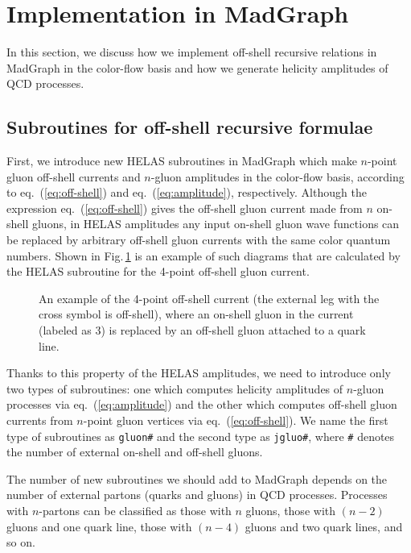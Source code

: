 \section{{\large Implementation in MadGraph}}
\label{implement}

In this section, we discuss how we implement off-shell recursive
relations in MadGraph in the color-flow
basis and how we generate helicity amplitudes of QCD processes.

\subsection{Subroutines for off-shell recursive formulae}
\label{subroutine}
First, we introduce new HELAS\cite{HELAS} subroutines in MadGraph which make
  $n$-point gluon off-shell currents and $n$-gluon amplitudes in the color-flow basis, according to
 eq.~(\ref{eq:off-shell}) and eq.~(\ref{eq:amplitude}),
  respectively. Although the expression eq.~(\ref{eq:off-shell}) gives
  the off-shell gluon current made from $n$
  on-shell gluons, in HELAS amplitudes any input on-shell gluon wave
  functions can be replaced by arbitrary off-shell gluon currents with the same
  color quantum numbers. Shown in
  Fig.\,\ref{fig:replace} is an
  example of such diagrams that are calculated by the HELAS subroutine for the
  4-point off-shell gluon current.
\begin{figure}
\caption{An example of the 4-point off-shell
 current (the external leg with the cross symbol is off-shell), where an
 on-shell gluon in the current (labeled as 3) is replaced by an off-shell gluon attached to
 a quark line.}
\label{fig:replace}
\end{figure}
Thanks to this property of the HELAS
  amplitudes, we need to introduce only two types of subroutines: one which computes
   helicity amplitudes of $n$-gluon processes via
  eq.~(\ref{eq:amplitude}) and the other which computes off-shell gluon
  currents from $n$-point gluon vertices via eq.~(\ref{eq:off-shell}). We
  name the first type of subroutines as {\tt gluon\#} and the second
  type as
  {\tt jgluo\#}, where {\tt \#} denotes the number of external on-shell
  and off-shell gluons.

The number of new subroutines we should
  add to MadGraph depends on the number of external partons (quarks and
  gluons) in QCD
  processes. Processes with $n$-partons can be classified as those
  with $n$ gluons, those with $(n-2)$ gluons and one quark line, those
  with $(n-4)$ gluons and two quark lines, and so on.

